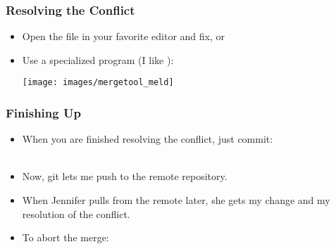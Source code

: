 \begin{frame}
  \frametitle{Resolving the Conflict}

  \begin{itemize}
  \item Open the file in your favorite editor and fix, or
  \item Use a specialized program (I like ): \\
    \medskip

    \texttt{[image: images/mergetool\_meld]}
  \end{itemize}
\end{frame}


\begin{frame}
  \frametitle{Finishing Up}

  \begin{itemize}
  \item When you are finished resolving the conflict, just commit:\\
    \\
  \item Now, git lets me push to the remote repository.
  \item When Jennifer pulls from the remote later, she gets my change
    and my resolution of the conflict.
  \item To abort the merge:\\
  \end{itemize}
\end{frame}


{
  \begin{frame}[plain]
  \end{frame}
}


